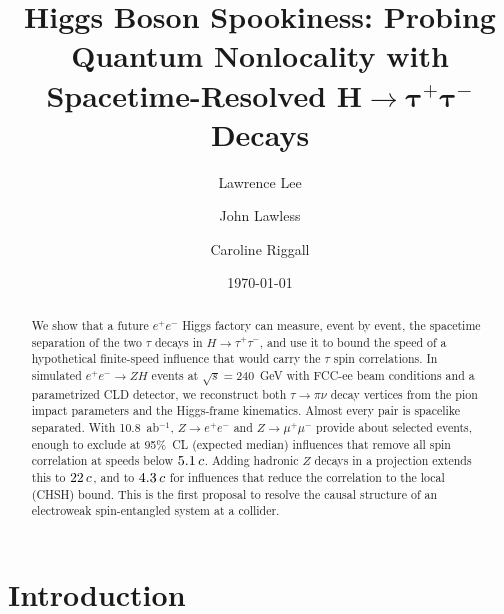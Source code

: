 \documentclass[%
 reprint,
 amsmath,amssymb,
 aps
]{revtex4-2}
\newcommand{\ee}{e^+e^-}
\newcommand{\tautau}{\tau^+\tau^-}
\newcommand{\Htautau}{H\!\to\!\tautau}
\newcommand{\sqrts}{\sqrt{s}}
\begin{document}
\preprint{}

\title{Higgs Boson Spookiness: Probing Quantum Nonlocality with Spacetime-Resolved \texorpdfstring{$\bm{H\!\to\!\tau^+\tau^-}$}{H -> tau+tau-} Decays}

\author{Lawrence Lee} %

\author{John Lawless} %

\author{Caroline Riggall} %

\date{\today}%

\begin{abstract}
We show that a future $\ee$ Higgs factory can measure, event by event, the spacetime separation of the two $\tau$ decays in $\Htautau$, and use it to bound the speed of a hypothetical finite-speed influence that would carry the $\tau$ spin correlations. In simulated $\ee\!\to\!ZH$ events at $\sqrts=240$~GeV with FCC-ee beam conditions and a parametrized CLD detector, we reconstruct both $\tau\to\pi\nu$ decay vertices from the pion impact parameters and the Higgs-frame kinematics. Almost every pair is spacelike separated. With 10.8~ab$^{-1}$, $Z\to e^+e^-$ and $Z\to\mu^+\mu^-$ provide about \numNSelLL{} selected events, enough to exclude at 95\%~CL (expected median) influences that remove all spin correlation at speeds below $5.1\,c$. Adding hadronic $Z$ decays in a projection extends this to $22\,c$, and to $4.3\,c$ for influences that reduce the correlation to the local (CHSH) bound. This is the first proposal to resolve the causal structure of an electroweak spin-entangled system at a collider.
\end{abstract}

\maketitle


\section{Introduction}
\label{sec:intro}
\end{document}
